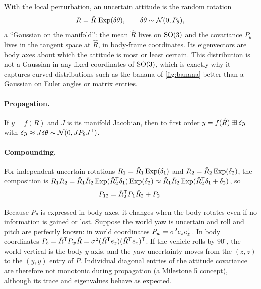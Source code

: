With the local perturbation, an uncertain attitude is the random rotation
\begin{equation}
  R = \hat R\,\operatorname{Exp}(\delta\theta), \qquad \delta\theta \sim \mathcal{N}(0, P_\theta),
\end{equation}
a ``Gaussian on the manifold'': the mean $\hat R$ lives on $\mathrm{SO}(3)$ and the covariance $P_\theta$ lives in the
tangent space at $\hat R$, in body-frame coordinates. Its eigenvectors are body axes about which the
attitude is most or least certain. This distribution is not a Gaussian in any fixed coordinates of
$\mathrm{SO}(3)$, which is exactly why it captures curved distributions such as the banana of \cref{fig:banana}
better than a Gaussian on Euler angles or matrix entries.

\paragraph{Propagation.} If $y = f(R)$ and $J$ is its manifold Jacobian, then to first order
$y = f(\hat R)\boxplus\delta y$ with $\delta y \approx J\delta\theta \sim \mathcal{N}(0, JP_\theta J^{\mathsf{T}})$.

\paragraph{Compounding.} For independent uncertain rotations $R_1 = \hat R_1\operatorname{Exp}(\delta_1)$ and
$R_2 = \hat R_2\operatorname{Exp}(\delta_2)$, the composition is
$R_1R_2 = \hat R_1\hat R_2\operatorname{Exp}(\hat R_2^{\mathsf{T}}\delta_1)\operatorname{Exp}(\delta_2) \approx \hat R_1\hat R_2\operatorname{Exp}(\hat R_2^{\mathsf{T}}\delta_1 + \delta_2)$, so
\begin{equation}
  P_{12} = \hat R_2^{\mathsf{T}} P_1\hat R_2 + P_2 .
\end{equation}

\begin{remark}
\label{rem:cov-rotates}
Because $P_\theta$ is expressed in body axes, it changes when the body rotates even if no information is
gained or lost. Suppose the world yaw is uncertain and roll and pitch are perfectly known: in world
coordinates $P_w = \sigma^2 e_ze_z^{\mathsf{T}}$. In body coordinates $P_b = \hat R^{\mathsf{T}} P_w\hat R = \sigma^2 (\hat R^{\mathsf{T}} e_z)(\hat R^{\mathsf{T}} e_z)^{\mathsf{T}}$.
If the vehicle rolls by $90^\circ$, the world vertical is the body $y$-axis, and the yaw uncertainty moves
from the $(z,z)$ to the $(y,y)$ entry of $P$. Individual diagonal entries of the attitude covariance
are therefore not monotonic during propagation (a Milestone 5 concept), although its trace and
eigenvalues behave as expected.
\end{remark}

